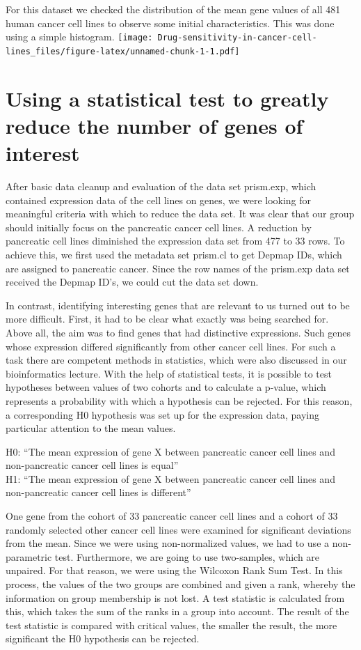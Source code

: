 \documentclass[
]{article}
\begin{document}
For this dataset we checked the distribution of the mean gene values of
all 481 human cancer cell lines to observe some initial characteristics.
This was done using a simple histogram.
\texttt{[image: Drug-sensitivity-in-cancer-cell-lines\_files/figure-latex/unnamed-chunk-1-1.pdf]}

\hypertarget{using-a-statistical-test-to-greatly-reduce-the-number-of-genes-of-interest}{%
\section{Using a statistical test to greatly reduce the number of genes
of
interest}\label{using-a-statistical-test-to-greatly-reduce-the-number-of-genes-of-interest}}

After basic data cleanup and evaluation of the data set prism.exp, which
contained expression data of the cell lines on genes, we were looking
for meaningful criteria with which to reduce the data set. It was clear
that our group should initially focus on the pancreatic cancer cell
lines. A reduction by pancreatic cell lines diminished the expression
data set from 477 to 33 rows. To achieve this, we first used the
metadata set prism.cl to get Depmap IDs, which are assigned to
pancreatic cancer. Since the row names of the prism.exp data set
received the Depmap ID's, we could cut the data set down.

In contrast, identifying interesting genes that are relevant to us
turned out to be more difficult. First, it had to be clear what exactly
was being searched for. Above all, the aim was to find genes that had
distinctive expressions. Such genes whose expression differed
significantly from other cancer cell lines. For such a task there are
competent methods in statistics, which were also discussed in our
bioinformatics lecture. With the help of statistical tests, it is
possible to test hypotheses between values of two cohorts and to
calculate a p-value, which represents a probability with which a
hypothesis can be rejected. For this reason, a corresponding H0
hypothesis was set up for the expression data, paying particular
attention to the mean values.

H0: ``The mean expression of gene X between pancreatic cancer cell lines
and non-pancreatic cancer cell lines is equal''\\
H1: ``The mean expression of gene X between pancreatic cancer cell lines
and non-pancreatic cancer cell lines is different''

One gene from the cohort of 33 pancreatic cancer cell lines and a cohort
of 33 randomly selected other cancer cell lines were examined for
significant deviations from the mean. Since we were using non-normalized
values, we had to use a non-parametric test. Furthermore, we are going
to use two-samples, which are unpaired. For that reason, we were using
the Wilcoxon Rank Sum Test. In this process, the values of the two
groups are combined and given a rank, whereby the information on group
membership is not lost. A test statistic is calculated from this, which
takes the sum of the ranks in a group into account. The result of the
test statistic is compared with critical values, the smaller the result,
the more significant the H0 hypothesis can be rejected.
\end{document}
